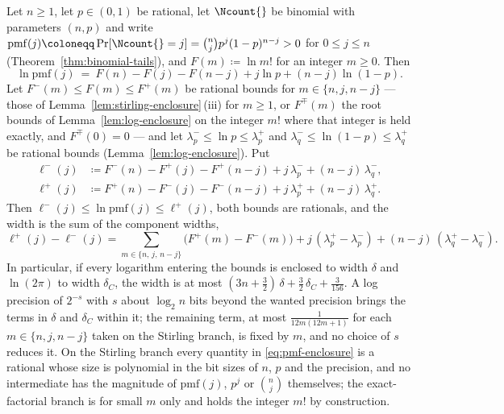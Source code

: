 \begin{lemma}\label{lem:pmf-enclosure}
Let $n\ge1$, let $p\in(0,1)$ be rational, let $\Ncount{}$ be binomial with
parameters $(n,p)$ and write $\mathrm{pmf}(j)\coloneqq\Pr[\Ncount{}=j]
=\binom{n}{j}p^{j}(1-p)^{n-j}>0$ for $0\le j\le n$ (Theorem~\ref{thm:binomial-tails}),
and $F(m)\coloneqq\ln m!$ for an integer $m\ge0$. Then
\begin{equation}\label{eq:lnpmf}
  \ln\mathrm{pmf}(j)\ =\ F(n)-F(j)-F(n-j)+j\ln p+(n-j)\ln(1-p).
\end{equation}
Let $F^{-}(m)\le F(m)\le F^{+}(m)$ be rational bounds for
$m\in\{n,j,n-j\}$ --- those of Lemma~\ref{lem:stirling-enclosure}\,(iii)
for $m\ge1$, or $F^{\mp}(m)$ the root bounds of
Lemma~\ref{lem:log-enclosure} on the integer $m!$ where that integer is held
exactly, and $F^{\mp}(0)=0$ --- and let
$\lambda_p^{-}\le\ln p\le\lambda_p^{+}$ and
$\lambda_q^{-}\le\ln(1-p)\le\lambda_q^{+}$ be rational bounds
(Lemma~\ref{lem:log-enclosure}). Put
\begin{equation}\label{eq:pmf-enclosure}
\begin{aligned}
  \ell^{-}(j)&\coloneqq F^{-}(n)-F^{+}(j)-F^{+}(n-j)
              +j\,\lambda_p^{-}+(n-j)\,\lambda_q^{-},\\
  \ell^{+}(j)&\coloneqq F^{+}(n)-F^{-}(j)-F^{-}(n-j)
              +j\,\lambda_p^{+}+(n-j)\,\lambda_q^{+}.
\end{aligned}
\end{equation}
Then $\ell^{-}(j)\le\ln\mathrm{pmf}(j)\le\ell^{+}(j)$, both bounds are
rationals, and the width is the sum of the component widths,
\begin{equation}\label{eq:pmf-width}
  \ell^{+}(j)-\ell^{-}(j)
  =\sum_{m\in\{n,\,j,\,n-j\}}\big(F^{+}(m)-F^{-}(m)\big)
  +j\,(\lambda_p^{+}-\lambda_p^{-})+(n-j)\,(\lambda_q^{+}-\lambda_q^{-}).
\end{equation}
In particular, if every logarithm entering the bounds is enclosed to width
$\delta$ and $\ln(2\pi)$ to width $\delta_C$, the width is at most
$(3n+\tfrac32)\,\delta+\tfrac32\,\delta_C+\tfrac{3}{156}$. A log precision
of $2^{-s}$ with $s$ about $\log_2 n$ bits beyond the wanted precision brings
the terms in $\delta$ and $\delta_C$ within it; the remaining term, at most
$\tfrac{1}{12m(12m+1)}$ for each $m\in\{n,j,n-j\}$ taken on the Stirling
branch, is fixed by $m$, and no choice of $s$ reduces it. On the Stirling
branch every quantity in \eqref{eq:pmf-enclosure} is a rational whose size
is polynomial in the bit sizes of $n$, $p$ and the precision, and no intermediate has the magnitude of $\mathrm{pmf}(j)$,
$p^{j}$ or $\binom{n}{j}$ themselves; the exact-factorial branch is for
small $m$ only and holds the integer $m!$ by construction.
\end{lemma}


